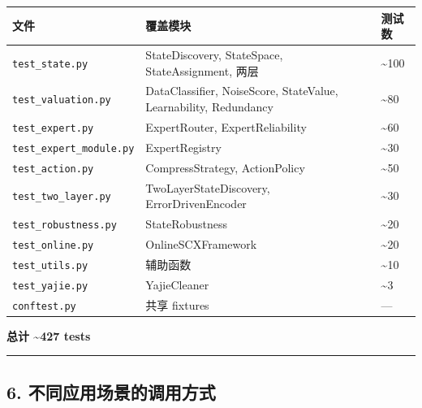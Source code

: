 \documentclass[
  12pt,
]{ctexart}
\begin{document}
\begin{longtable}[]{@{}
  >{\raggedright\arraybackslash}p{}
  >{\raggedright\arraybackslash}p{}
  >{\raggedright\arraybackslash}p{}@{}}
\toprule\noalign{}
\begin{minipage}[b]{\linewidth}\raggedright
文件
\end{minipage} & \begin{minipage}[b]{\linewidth}\raggedright
覆盖模块
\end{minipage} & \begin{minipage}[b]{\linewidth}\raggedright
测试数
\end{minipage} \\
\midrule\noalign{}
\endhead
\bottomrule\noalign{}
\endlastfoot
\texttt{test\_state.py} & StateDiscovery, StateSpace, StateAssignment,
两层 & \textasciitilde100 \\
\texttt{test\_valuation.py} & DataClassifier, NoiseScore, StateValue,
Learnability, Redundancy & \textasciitilde80 \\
\texttt{test\_expert.py} & ExpertRouter, ExpertReliability &
\textasciitilde60 \\
\texttt{test\_expert\_module.py} & ExpertRegistry & \textasciitilde30 \\
\texttt{test\_action.py} & CompressStrategy, ActionPolicy &
\textasciitilde50 \\
\texttt{test\_two\_layer.py} & TwoLayerStateDiscovery,
ErrorDrivenEncoder & \textasciitilde30 \\
\texttt{test\_robustness.py} & StateRobustness & \textasciitilde20 \\
\texttt{test\_online.py} & OnlineSCXFramework & \textasciitilde20 \\
\texttt{test\_utils.py} & 辅助函数 & \textasciitilde10 \\
\texttt{test\_yajie.py} & YajieCleaner & \textasciitilde3 \\
\texttt{conftest.py} & 共享 fixtures & --- \\
\end{longtable}

\textbf{总计 \textasciitilde427 tests}

\begin{center}\rule{0.5\linewidth}{0.5pt}\end{center}

\subsection{6.
不同应用场景的调用方式}\label{ux4e0dux540cux5e94ux7528ux573aux666fux7684ux8c03ux7528ux65b9ux5f0f}
\end{document}
